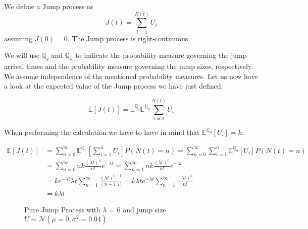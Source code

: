 \documentclass[times, utf8, diplomski]{fer}
\begin{document}
		\begin{definition}
			We define a Jump process as 
			\begin{equation}
				J(t) = \sum_{i=1}^{N(t)} U_i
			\end{equation}
			assuming $J(0) = 0$. The Jump process is right-continuous.
		\end{definition}

		\noindent We will use $\mathbb{Q}_j$ and $\mathbb{Q}_u$ to indicate the probability measure governing the jump arrival times and the probability measure governing the jump sizes, respectively. We assume independence of the mentioned probability measures. Let us now have a look at the expected value of the Jump process we have just defined:

		\begin{equation} \label{eqn_e_jump} %
		\mathbb{E}[J(t)] = \mathbb{E}^{\mathbb{Q}_j}\mathbb{E}^{\mathbb{Q}_u} \sum_{i=1}^{N(t)} U_i
		\end{equation}

		\noindent When performing the calculation we have to have in mind that $\mathbb{E}^{\mathbb{Q}_u}[U_i] = k$.

		\begin{equation}
		\begin{split}
			\mathbb{E}[J(t)] &= \sum_{n=0}^{\infty}\mathbb{E}^{\mathbb{Q}_u} \left[ \sum_{i=1}^{n} U_i \right] P(N(t)=n) = \sum_{n=0}^{\infty}\sum_{i=1}^{n} \mathbb{E}^{\mathbb{Q}_u}\left[U_i\right] P(N(t)=n) \\
			&= \sum_{n=0}^{\infty} nk\frac{(\lambda t)^n}{n!}e^{-\lambda t} = \sum_{n=1}^{\infty} nk\frac{(\lambda t)^n}{n!}e^{-\lambda t} \\
			&= ke^{-\lambda t}\lambda t\sum_{n=1}^{\infty}\frac{(\lambda t)^{n-1}}{(n-1)!} = k\lambda te^{-\lambda t}\sum_{n=1}^{\infty}\frac{(\lambda t)^n}{n!} \\
			&= k\lambda t
		\end{split}
		\end{equation}

		\begin{figure}
		\centering
		\caption{Pure Jump Process with $\lambda$ = 6 and jump size $U \sim \mathcal{N}(\mu=0,\sigma^2=0.04)$}
		\label{fig:pure_jump_process}
		\end{figure}
\end{document}
